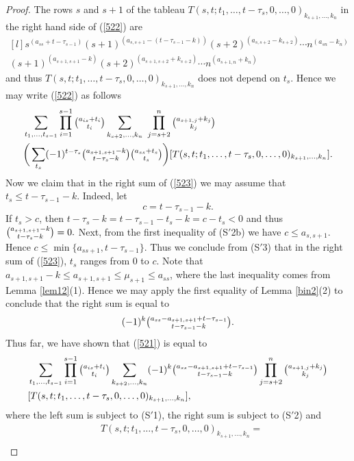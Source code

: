 \documentclass[ALCO,Unicode]{cedram}
\numberwithin{equation}{section}
\begin{document}
\begin{proof}
	The rows $s$ and $s+1$ of the tableau $T(s,t;t_1,\dots,t-\tau_s,0,\dots,0)_{k_{s+1},\dots,k_n}$ in the right hand side of (\ref{522}) are
	\[	\begin{matrix*}[l]
		s^{(a_{ss}+t-\tau_{s-1})}(s+1)^{(a_{s,s+1}-(t-\tau_{s-1}-k))} (s+2)^{(a_{s,s+2}-k_{s+2})}\cdots n^{(a_{sn}-k_n)} \\
		(s+1)^{(a_{s+1,s+1}-k)} (s+2)^{(a_{s+1,s+2}+k_{s+2})}\cdots n^{(a_{s+1,n}+k_n)}
		  \end{matrix*}\]
	and thus $T(s,t;t_1,\dots,t-\tau_s,0,\dots,0)_{k_{s+1},\dots,k_n}$ does not depend on $t_s$. Hence we may write (\ref{522}) as  follows
	\begin{align}\label{523}
		&\sum_{t_1,\dots,t_{s-1}}\prod_{i=1}^{s-1}\tbinom{a_{is}+t_i}{t_i}  \sum_{k_{s+2},\dots,k_n} \  \prod_{j=s+2}^{n}\tbinom{a_{s+1,j}+k_{j}}{k_{j}} \\\nonumber&\bigg(\sum_{t_s} (-1)^{t-\tau_{s}}\tbinom{a_{s+1,s+1}-k}{t-\tau_s -k}\tbinom{a_{ss}+t_s}{t_s} \bigg) [T(s,t;t_1,\dots,t-\tau_s,0,\dots,0)_{k_{s+1},\dots,k_n}]. \end{align}
		Now we claim that in the right sum of (\ref{523}) we may assume that $t_s \le t-\tau_{s-1}-k$. Indeed, let \[c=t-\tau_{s-1}-k.\] If $t_s > c$, then $t-\tau_s-k = t-\tau_{s-1} -t_s-k =c-t_s<0$ and thus $\tbinom{a_{s+1,s+1}-k}{t-\tau_s -k}=0.$ Next, from the first inequality of (S$'$2b) we have $c\le a_{s,s+1}$. Hence $c \le \min\{a_{ss+1}, t-\tau_{s-1}\}$. Thus we conclude from (S$'$3) that in the right sum of (\ref{523}), $t_s$ ranges from 0 to $c$. Note that $a_{s+1, s+1}-k \le  a_{s+1, s+1} \le \mu_{s+1} \le a_{ss}$, where the last inequality comes from Lemma \ref{lem12}(1).  Hence we may apply the first equality of Lemma \ref{bin2}(2) to conclude that the right sum is equal to \[(-1)^k \tbinom{a_{ss}-a_{s+1,s+1}+t-\tau_{s-1}}{t-\tau_{s-1}-k}.\] Thus far, we have shown that (\ref{521}) is equal to 
	\begin{align}\label{525}
		&\sum_{t_1,\dots,t_{s-1}}\prod_{i=1}^{s-1}\tbinom{a_{is}+t_i}{t_i}  \sum_{k_{s+2},\dots,k_n}(-1)^k \tbinom{a_{ss}-a_{s+1,s+1}+t-\tau_{s-1}}{t-\tau_{s-1}-k}\prod_{j=s+2}^{n}\tbinom{a_{s+1,j}+k_{j}}{k_{j}} \\\nonumber& [T(s,t;t_1,\dots,t-\tau_s,0,\dots,0)_{k_{s+1},\dots,k_n}], \end{align}
	where the left sum is subject to (S$'$1), the right sum is subject to (S$'$2) and \begin{align}\label{526} &T(s,t;t_1,\dots,t-\tau_s,0,\dots,0)_{k_{s+1},\dots,k_n} = \\\nonumber &

\end{align}
\end{proof}
\end{document}
